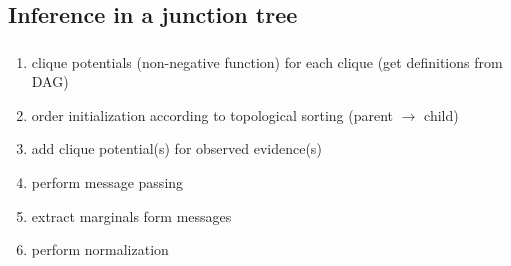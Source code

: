 \subsection{Inference in a junction tree}

\begin{frame}\frametitle{\subsecname}

\begin{enumerate}
\item clique potentials (non-negative function) for each clique (get definitions from DAG)
\item order initialization according to topological sorting (parent $\rightarrow$ child)
\item add clique potential(s) for observed evidence(s)
\item perform message passing
\item extract marginals form messages
\item perform normalization
\end{enumerate}



\end{frame}
